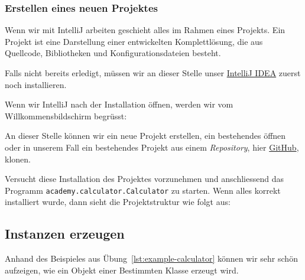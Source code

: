 \mode*
\begin{Exercise}[%
title={Ein einfacher Taschenrechner},
label={ex:calculator}]

    \subsubsection*{Erstellen eines neuen Projektes}

    Wenn wir mit IntelliJ arbeiten geschieht alles im Rahmen eines Projekts.
    Ein Projekt ist eine Darstellung einer entwickelten Komplettlösung, die
    aus Quellcode, Bibliotheken und Konfigurationsdateien besteht.

    Falls nicht bereits erledigt, müssen wir an dieser Stelle unser
    \href{https://www.jetbrains.com/idea}{IntelliJ IDEA} zuerst noch installieren.

    Wenn wir IntelliJ nach der Installation öffnen, werden wir vom
    Willkommensbildschirm begrüsst:


    An dieser Stelle können wir ein neue Projekt erstellen, ein bestehendes öffnen
    oder in unserem Fall ein bestehendes Projekt aus einem \emph{Repository}, hier
    \href{https://github.com/dsenften/example-simple-calculator.git}{GitHub},
    klonen.

    Versucht diese Installation des Projektes vorzunehmen und anschliessend
    das Programm \texttt{academy.calculator.Calculator} zu starten. Wenn alles
    korrekt installiert wurde, dann sieht die Projektstruktur wie folgt aus:



\end{Exercise}


\subsection{Instanzen erzeugen}
\label{subsec:create-instance}

Anhand des Beispieles aus Übung~\ref{lst:example-calculator} können wir sehr schön aufzeigen,
wie ein Objekt einer Bestimmten Klasse erzeugt wird.


